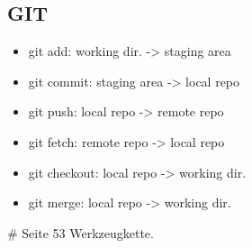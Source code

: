 \subsection{GIT}
\begin{itemize}
    \item git add: working dir. -> staging area
    \item git commit: staging area -> local repo
    \item git push: local repo -> remote repo
    \item git fetch: remote repo -> local repo
    \item git checkout: local repo -> working dir.
    \item git merge: local repo -> working dir.
\end{itemize}

\# Seite 53 Werkzeugkette.




